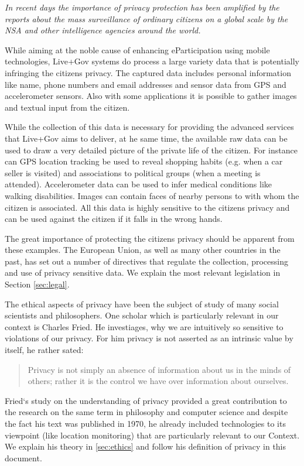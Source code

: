 \documentclass[runningheads,a4paper]{llncs}
\newenvironment{LGContent}
{ \par\color{blue} \it \small }
{ \par }
\begin{document}
\begin{LGContent}
In recent days the importance of privacy protection has been amplified
by the reports about the mass surveillance of ordinary citizens on a
global scale by the NSA and other intelligence agencies around the
world.

While aiming at the noble cause of enhancing eParticipation using
mobile technologies, Live+Gov systems do process a large variety data
that is potentially infringing the citizens privacy. The captured data
includes personal information like name, phone numbers and email
addresses and sensor data from GPS and accelerometer sensors. Also
with some applications it is possible to gather images and textual
input from the citizen.

While the collection of this data is necessary for providing the
advanced services that Live+Gov aims to deliver, at he same time, the
available raw data can be used to draw a very detailed picture of the
private life of the citizen. For instance can GPS location tracking be
used to reveal shopping habits (e.g. when a car seller is visited) and
associations to political groups (when a meeting is
attended). Accelerometer data can be used to infer medical conditions
like walking disabilities. Images can contain faces of nearby persons
to with whom the citizen is associated. All this data is highly
sensitive to the citizens privacy and can be used against the citizen
if it falls in the wrong hands.

The great importance of protecting the citizens privacy should be
apparent from these examples. The European Union, as well as many
other countries in the past, has set out a number of directives that
regulate the collection, processing and use of privacy sensitive
data. We explain the most relevant legislation in Section
\ref{sec:legal}.

The ethical aspects of privacy have been the subject of study of many
social scientists and philosophers. One scholar which is particularly
relevant in our context is Charles Fried. He investiages, why we are
intuitively so sensitive to violations of our privacy. For him privacy
is not asserted as an intrinsic value by itself, he rather sated:

\begin{quote}
Privacy is not simply an absence of information about us in the minds of others;
rather it is the control we have over information about ourselves.
\end{quote}

Fried`s study on the understanding of privacy provided a great
contribution to the research on the same term in philosophy and
computer science and despite the fact his text was published in 1970,
he already included technologies to its viewpoint (like location
monitoring) that are particularly relevant to our Context.  We explain
his theory in \ref{sec:ethics} and follow his definition of privacy in
this document.


\end{LGContent}
\end{document}
